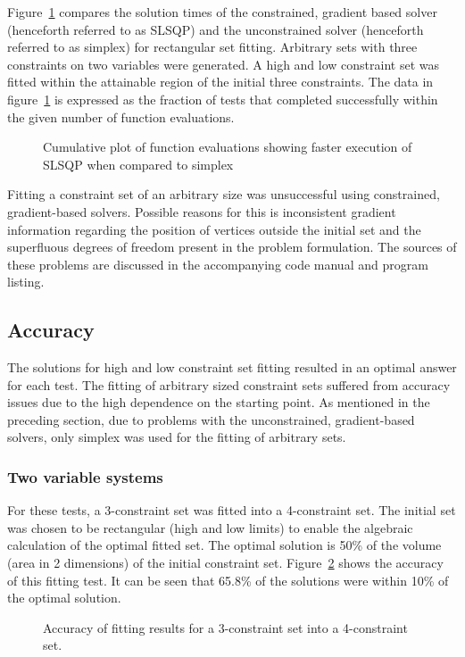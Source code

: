Figure~\ref{fig:cubefittime} compares the solution times of the constrained, gradient based solver (henceforth referred to as SLSQP) and the unconstrained solver (henceforth referred to as simplex) for rectangular set fitting.
Arbitrary sets with three constraints on two variables were generated.
A high and low constraint set was fitted within the attainable region of the initial three constraints.
The data in figure~\ref{fig:cubefittime} is expressed as the fraction of tests that completed successfully within the given number of function evaluations.

\begin{figure}[htbp]
  \centering
    \scalebox{1}{}  
  \caption[SLSQP and simplex calculation time comparison]{Cumulative plot of function evaluations showing faster execution of SLSQP when compared to simplex}
  \label{fig:cubefittime}
\end{figure}

Fitting a constraint set of an arbitrary size was unsuccessful using constrained, gradient-based solvers.
Possible reasons for this is inconsistent gradient information regarding the position of vertices outside the initial set and the superfluous degrees of freedom present in the problem formulation.
The sources of these problems are discussed in the accompanying code manual and program listing.

\subsection{Accuracy}\label{sec:fittingaccuracy}
The solutions for high and low constraint set fitting resulted in an optimal answer for each test.
The fitting of arbitrary sized constraint sets suffered from accuracy issues due to the high dependence on the starting point.
As mentioned in the preceding section, due to problems with the unconstrained, gradient-based solvers, only simplex was used for the fitting of arbitrary sets.

\subsubsection{Two variable systems}\label{sec:2dfitting}
For these tests, a 3-constraint set was fitted into a 4-constraint set.
The initial set was chosen to be rectangular (high and low limits) to enable the algebraic calculation of the optimal fitted set.
The optimal solution is 50\% of the volume (area in 2 dimensions) of the initial constraint set.
Figure~\ref{fig:arbfitaccuracy2d} shows the accuracy of this fitting test.
It can be seen that 65.8\% of the solutions were within 10\% of the optimal solution.
\begin{figure}[htbp]
  \centering
    \scalebox{1}{}
  \caption[Accuracy of constraint set fitting for 2 variables]{Accuracy of fitting results for a 3-constraint set into a 4-constraint set.}
  \label{fig:arbfitaccuracy2d}
\end{figure}

